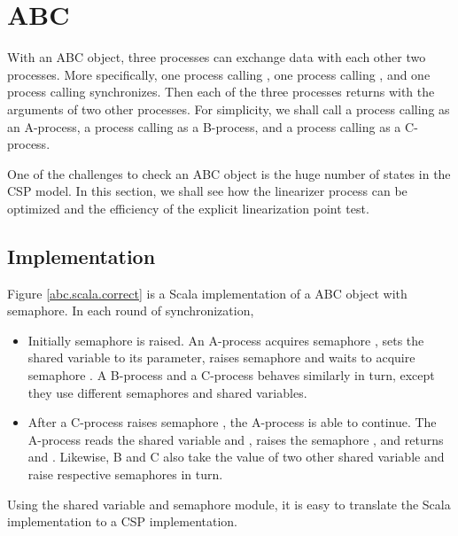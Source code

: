 \documentclass[a4paper, 12pt]{article}
\begin{document}
\newpage
\section{ABC}
With an ABC object, three processes can exchange data with each other two processes. More specifically, one process calling , one process calling , and one process calling  synchronizes. Then each of the three processes returns with the arguments of two other processes. For simplicity, we shall call a process calling  as an A-process, a process calling  as a B-process, and a process calling  as a C-process. 

One of the challenges to check an ABC object is the huge number of states in the CSP model. In this section, we shall see how the linearizer process can be optimized and the efficiency of the explicit linearization point test.

\subsection{Implementation}
Figure \ref{abc.scala.correct} is a Scala implementation of a ABC object with semaphore. In each round of synchronization,
\begin{itemize}
    \item Initially semaphore  is raised. An A-process acquires semaphore , sets the shared variable  to its parameter, raises semaphore  and waits to acquire semaphore . A B-process and a C-process behaves similarly in turn, except they use different semaphores and shared variables. 
    \item After a C-process raises semaphore , the A-process is able to continue. The A-process reads the shared variable  and , raises the semaphore , and returns  and . Likewise, B and C also take the value of two other shared variable and raise respective semaphores in turn.
\end{itemize}

Using the shared variable and semaphore module, it is easy to translate the Scala implementation to a CSP implementation.
\end{document}
